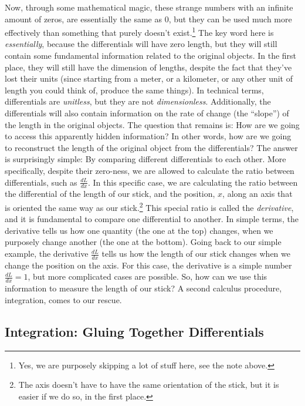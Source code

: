 \documentclass[
  9pt,
]{extbook}
\theoremstyle{definition}
\theoremstyle{definition}
\theoremstyle{definition}
\theoremstyle{definition}
\theoremstyle{remark}
\begin{document}
Now, through some mathematical magic, these strange numbers with an infinite amount of zeros, are essentially the same as \(0\), but they can be used much more effectively than something that purely doesn't exist.\footnote{Yes, we are purposely skipping a lot of stuff here, see the note above.} The key word here is \emph{essentially}, because the differentials will have zero length, but they will still contain some fundamental information related to the original objects. In the first place, they will still have the dimension of lengths, despite the fact that they've lost their units (since starting from a meter, or a kilometer, or any other unit of length you could think of, produce the same things). In technical terms, differentials are \emph{unitless}, but they are not \emph{dimensionless}. Additionally, the differentials will also contain information on the rate of change (the ``slope'') of the length in the original objects. The question that remains is: How are we going to access this apparently hidden information? In other words, how are we going to reconstruct the length of the original object from the differentials? The answer is surprisingly simple: By comparing different differentials to each other. More specifically, despite their zero-ness, we are allowed to calculate the ratio between differentials, such as \(\frac{dL}{dx}\). In this specific case, we are calculating the ratio between the differential of the length of our stick, and the position, \(x\), along an axis that is oriented the same way as our stick.\footnote{The axis doesn't have to have the same orientation of the stick, but it is easier if we do so, in the first place.} This special ratio is called the \emph{derivative}, and it is fundamental to compare one differential to another. In simple terms, the derivative tells us how one quantity (the one at the top) changes, when we purposely change another (the one at the bottom). Going back to our simple example, the derivative \(\frac{dL}{dx}\) tells us how the length of our stick changes when we change the position on the axis. For this case, the derivative is a simple number \(\frac{dL}{dx}=1\), but more complicated cases are possible. So, how can we use this information to measure the length of our stick? A second calculus procedure, integration, comes to our rescue.

\subsection{Integration: Gluing Together Differentials}\label{integration-gluing-together-differentials}
\end{document}
